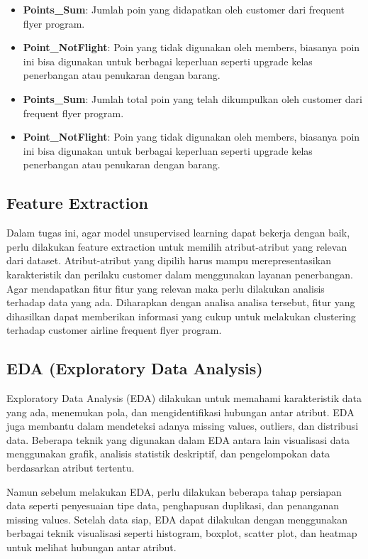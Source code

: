 \begin{itemize}
    \item \textbf{Points\_Sum}: Jumlah poin yang didapatkan oleh customer dari frequent flyer program.
    \item \textbf{Point\_NotFlight}: Poin yang tidak digunakan oleh members, biasanya poin ini bisa digunakan untuk berbagai keperluan seperti upgrade kelas penerbangan atau penukaran dengan barang.
    \item \textbf{Points\_Sum}: Jumlah total poin yang telah dikumpulkan oleh customer dari frequent flyer program.
    \item \textbf{Point\_NotFlight}: Poin yang tidak digunakan oleh members, biasanya poin ini bisa digunakan untuk berbagai keperluan seperti upgrade kelas penerbangan atau penukaran dengan barang.
\end{itemize}

\subsection{Feature Extraction}
Dalam tugas ini, agar model unsupervised learning dapat bekerja dengan baik, perlu dilakukan feature extraction untuk memilih atribut-atribut yang relevan dari dataset. Atribut-atribut yang dipilih harus mampu merepresentasikan karakteristik dan perilaku customer dalam menggunakan layanan penerbangan. Agar mendapatkan fitur fitur yang relevan maka perlu dilakukan analisis terhadap data yang ada. Diharapkan dengan analisa analisa tersebut, fitur yang dihasilkan dapat memberikan informasi yang cukup untuk melakukan clustering terhadap customer airline frequent flyer program.

\subsection{EDA (Exploratory Data Analysis)}
Exploratory Data Analysis (EDA) dilakukan untuk memahami karakteristik data yang ada, menemukan pola, dan mengidentifikasi hubungan antar atribut. EDA juga membantu dalam mendeteksi adanya missing values, outliers, dan distribusi data. Beberapa teknik yang digunakan dalam EDA antara lain visualisasi data menggunakan grafik, analisis statistik deskriptif, dan pengelompokan data berdasarkan atribut tertentu.

Namun sebelum melakukan EDA, perlu dilakukan beberapa tahap persiapan data seperti penyesuaian tipe data, penghapusan duplikasi, dan penanganan missing values. Setelah data siap, EDA dapat dilakukan dengan menggunakan berbagai teknik visualisasi seperti histogram, boxplot, scatter plot, dan heatmap untuk melihat hubungan antar atribut.


